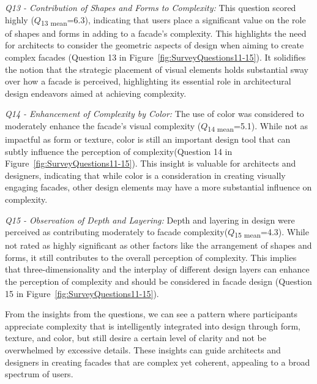 \textit{Q13 - Contribution of Shapes and Forms to Complexity:}
This question scored highly (\(Q\)\textsubscript{\small{13 mean}}=6.3), indicating that users place a significant value on the role of shapes and forms in adding to a facade's complexity.
This highlights the need for architects to consider the geometric aspects of design when aiming to create complex facades (Question 13 in Figure~\ref{fig:SurveyQuestions11-15}). It solidifies the notion that the strategic placement of visual elements holds substantial sway over how a facade is perceived, highlighting its essential role in architectural design endeavors aimed at achieving complexity.

\textit{Q14 - Enhancement of Complexity by Color:}
The use of color was considered to moderately enhance the facade's visual complexity (\(Q\)\textsubscript{\small{14 mean}}=5.1).
While not as impactful as form or texture, color is still an important design tool that can subtly influence the perception of complexity(Question 14 in Figure~\ref{fig:SurveyQuestions11-15}).
This insight is valuable for architects and designers, indicating that while color is a consideration in creating visually engaging facades, other design elements may have a more substantial influence on complexity.

\textit{Q15 - Observation of Depth and Layering:}
Depth and layering in design were perceived as contributing moderately to facade complexity(\(Q\)\textsubscript{\small{15 mean}}=4.3).
While not rated as highly significant as other factors like the arrangement of shapes and forms, it still contributes to the overall perception of complexity.
This implies that three-dimensionality and the interplay of different design layers can enhance the perception of complexity and should be considered in facade design (Question 15 in Figure~\ref{fig:SurveyQuestions11-15}).

From the insights from the questions, we can see a pattern where participants appreciate complexity that is intelligently integrated into design through form, texture, and color, but still desire a certain level of clarity and not be overwhelmed by excessive details.
These insights can guide architects and designers in creating facades that are complex yet coherent, appealing to a broad spectrum of users.

